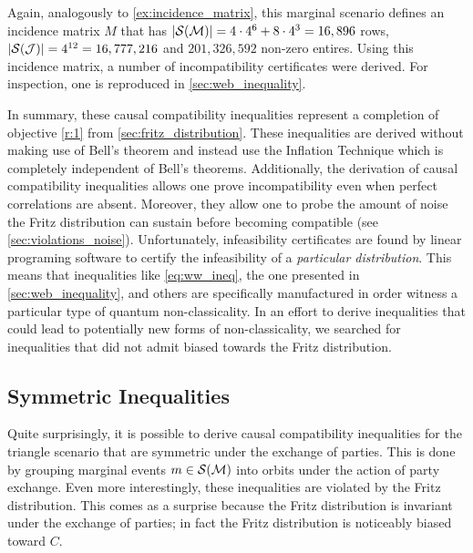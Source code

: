 \documentclass[aps, 10pt, english, twoside, pra, nofootinbib, tightenlines, longbibliography]{revtex4-1}
\renewcommand{\Events}[1]{\mathcal{S}\br{#1}} %
\begin{document}
    Again, analogously to \cref{ex:incidence_matrix}, this marginal scenario defines an incidence matrix $M$ that has $\abs{\Events{\mscenario}} = 4 \cdot 4^{6} + 8 \cdot 4^3 = 16,896$ rows, $\abs{\Events{\jointvar}} = 4^{12} = 16,777,216$ and $201,326,592$ non-zero entires. Using this incidence matrix, a number of incompatibility certificates were derived. For inspection, one is reproduced in \cref{sec:web_inequality}.

    In summary, these causal compatibility inequalities represent a completion of objective \cref{r:1} from \cref{sec:fritz_distribution}. These inequalities are derived without making use of Bell's theorem and instead use the Inflation Technique which is completely independent of Bell's theorems. Additionally, the derivation of causal compatibility inequalities allows one prove incompatibility even when perfect correlations are absent. Moreover, they allow one to probe the amount of noise the Fritz distribution can sustain before becoming compatible (see \cref{sec:violations_noise}). Unfortunately, infeasibility certificates are found by linear programing software to certify the infeasibility of a \textit{particular distribution}. This means that inequalities like \cref{eq:ww_ineq}, the one presented in \cref{sec:web_inequality}, and others are specifically manufactured in order witness a particular type of quantum non-classicality. In an effort to derive inequalities that could lead to potentially new forms of non-classicality, we searched for inequalities that did not admit biased towards the Fritz distribution.

    \subsection{Symmetric Inequalities}
    \label{sec:symmetric_inequalities}

    Quite surprisingly, it is possible to derive causal compatibility inequalities for the triangle scenario that are symmetric under the exchange of parties. This is done by grouping marginal events $m \in \Events{\mscenario}$ into orbits under the action of party exchange. Even more interestingly, these inequalities are violated by the Fritz distribution. This comes as a surprise because the Fritz distribution is  invariant under the exchange of parties; in fact the Fritz distribution is noticeably biased toward $C$.
\end{document}
